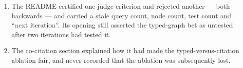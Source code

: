 \begin{enumerate}[label=H\arabic*.]
  \item The README certified one judge criterion and rejected another --- both
        backwards --- and carried a stale query count, node count, test count and
        ``next iteration''. Its opening still asserted the typed-graph bet as
        untested after two iterations had tested it.
  \item The co-citation section explained how it had made the typed-versus-citation
        ablation fair, and never recorded that the ablation was subsequently
        lost.
\end{enumerate}
